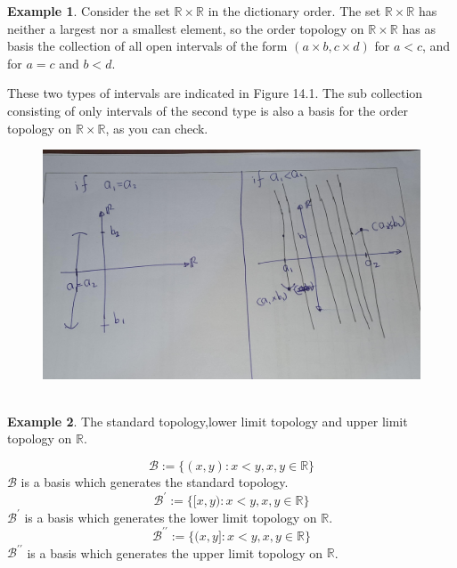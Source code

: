 \documentclass[
]{book}
\theoremstyle{definition}
\theoremstyle{definition}
\newtheorem{example}{Example}[chapter]
\theoremstyle{definition}
\theoremstyle{definition}
\theoremstyle{remark}
\begin{document}
\begin{example}
\protect\hypertarget{exm:unnamed-chunk-24}{}\label{exm:unnamed-chunk-24}Consider the set \(\mathbb{R} \times \mathbb{R}\) in the dictionary order. The set \(\mathbb{R} \times \mathbb{R}\) has neither a largest nor a smallest element, so the order topology on \(\mathbb{R} \times \mathbb{R}\) has as basis the collection of all open intervals of the form \((a \times b, c \times d)\) for \(a < c\), and for \(a = c\) and \(b < d\).

These two types of intervals are indicated in Figure 14.1. The sub collection consisting of only intervals of the second type is also a basis for the order topology on \(\mathbb{R} \times \mathbb{R}\), as you can check.
\end{example}

\begin{figure}
\centering
\includegraphics{figures/figure 07.jpg}
\caption{\label{fig:fi7}\(~\)}
\end{figure}

\begin{example}
\protect\hypertarget{exm:unnamed-chunk-25}{}\label{exm:unnamed-chunk-25}The standard topology,lower limit topology and upper limit topology on \(\mathbb{R}\).

\[\mathcal{B}:=\{(x,y):x<y, x,y\in \mathbb{R}\}\]
\(\mathcal{B}\) is a basis which generates the standard topology.
\[\mathcal{B}^\prime:=\{[x,y):x<y, x,y\in \mathbb{R}\}\]
\(\mathcal{B}^\prime\) is a basis which generates the lower limit topology on \(\mathbb{R}\).
\[\mathcal{B}^{\prime\prime}:=\{(x,y]:x<y, x,y\in \mathbb{R}\}\]
\(\mathcal{B}^{\prime\prime}\) is a basis which generates the upper limit topology on \(\mathbb{R}\).
\end{example}
\end{document}
